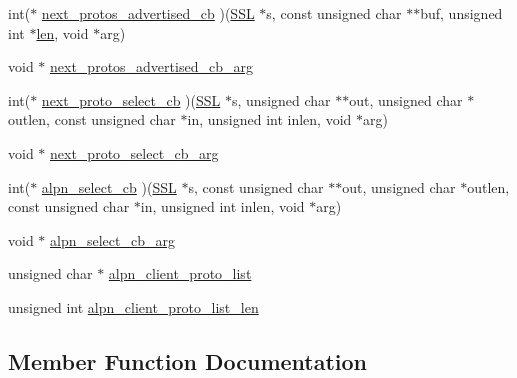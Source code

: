 \begin{DoxyCompactItemize}
\item 
int($\ast$ \hyperlink{structssl__ctx__st_adb86f747421d5b58cf4bb5a49e2852bf}{next\+\_\+protos\+\_\+advertised\+\_\+cb} )(\hyperlink{ossl__typ_8h_a71f21e09bf365489dab9d85bd4785e24}{S\+SL} $\ast$s, const unsigned char $\ast$$\ast$buf, unsigned int $\ast$\hyperlink{x509_8h_ad8c3db4434e9cb5cd772cc009f40e856}{len}, void $\ast$arg)
\item 
void $\ast$ \hyperlink{structssl__ctx__st_ac8a1f0523b26a16a16af4776041850f6}{next\+\_\+protos\+\_\+advertised\+\_\+cb\+\_\+arg}
\item 
int($\ast$ \hyperlink{structssl__ctx__st_a0064f01fff457ffcbd1182ddd51839b8}{next\+\_\+proto\+\_\+select\+\_\+cb} )(\hyperlink{ossl__typ_8h_a71f21e09bf365489dab9d85bd4785e24}{S\+SL} $\ast$s, unsigned char $\ast$$\ast$out, unsigned char $\ast$outlen, const unsigned char $\ast$in, unsigned int inlen, void $\ast$arg)
\item 
void $\ast$ \hyperlink{structssl__ctx__st_ac7f01a164bb2f9ded179bd27940926bf}{next\+\_\+proto\+\_\+select\+\_\+cb\+\_\+arg}
\item 
int($\ast$ \hyperlink{structssl__ctx__st_a0d08de0a93374586a4f818171e49eff6}{alpn\+\_\+select\+\_\+cb} )(\hyperlink{ossl__typ_8h_a71f21e09bf365489dab9d85bd4785e24}{S\+SL} $\ast$s, const unsigned char $\ast$$\ast$out, unsigned char $\ast$outlen, const unsigned char $\ast$in, unsigned int inlen, void $\ast$arg)
\item 
void $\ast$ \hyperlink{structssl__ctx__st_aae35dbc7321a52ce8aff7b5b6b0a23eb}{alpn\+\_\+select\+\_\+cb\+\_\+arg}
\item 
unsigned char $\ast$ \hyperlink{structssl__ctx__st_a28a0a2ba5425026ecc984941a26b6934}{alpn\+\_\+client\+\_\+proto\+\_\+list}
\item 
unsigned int \hyperlink{structssl__ctx__st_aff08e359750548f5b49a49ce125a8e39}{alpn\+\_\+client\+\_\+proto\+\_\+list\+\_\+len}
\end{DoxyCompactItemize}


\subsection{Member Function Documentation}

